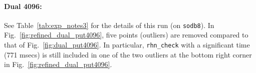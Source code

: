 \documentclass[10pt]{article}
\begin{document}
\vspace{-.2in}

\paragraph{Dual 4096:} See Table~\ref{tab:exp_notes3} for the details of this run (on {\tt sodb8}). In Fig.~\ref{fig:refined_dual_put4096}, five points (outliers) are removed compared to that of Fig.~\ref{fig:dual_put4096}. 
{\color{blue}In particular, {\tt rhn\_check} with a significant time (771 msecs) is still included in one of the two outliers at the bottom right corner in Fig.~\ref{fig:refined_dual_put4096}.}
\begin{figure}[h]
	\centering
\end{figure}
\end{document}
